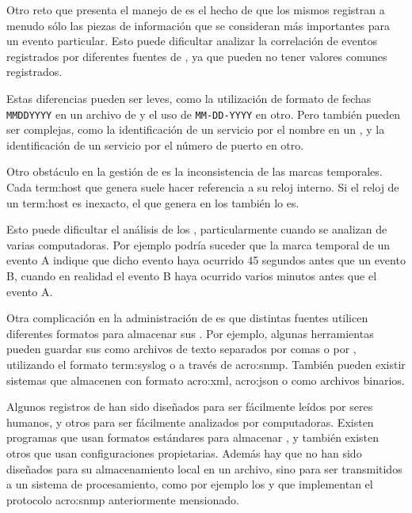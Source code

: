 Otro reto que presenta el manejo de  es el hecho de que los mismos
registran a menudo sólo las piezas de información que se consideran
más importantes para un evento particular. Esto puede dificultar analizar la
correlación de eventos registrados por diferentes fuentes de , ya que
pueden no tener valores comunes registrados.

Estas diferencias pueden ser leves, como la utilización de formato de fechas
\texttt{MMDDYYYY} en un archivo de  y el uso de \texttt{MM-DD-YYYY}
en otro. Pero también pueden ser complejas, como la identificación de un
servicio por el nombre en un , y la identificación de un servicio por
el número de puerto en otro.

Otro obstáculo en la gestión de  es la inconsistencia de las marcas
temporales. Cada \gls{term:host} que genera  suele hacer referencia a
su reloj interno. Si el reloj de un \gls{term:host} es inexacto, el
 que genera en los  también lo es.

Esto puede dificultar el análisis de los , particularmente cuando se
analizan  de varias computadoras. Por ejemplo podría suceder que la
marca temporal de un evento A indique que dicho evento haya ocurrido 45
segundos antes que un evento B, cuando en realidad el evento B haya ocurrido
varios minutos antes que el evento A.

Otra complicación en la administración de  es que distintas fuentes
utilicen diferentes formatos para almacenar sus . Por ejemplo,
algunas herramientas pueden guardar sus  como archivos de texto
separados por comas o por , utilizando el formato \gls{term:syslog} o
a través de \gls{acro:snmp}. También pueden existir sistemas que almacenen
 con formato \gls{acro:xml}, \gls{acro:json} o como archivos
binarios.

Algunos registros de  han sido diseñados para ser fácilmente leídos
por seres humanos, y otros para ser fácilmente analizados por computadoras.
Existen programas que usan formatos estándares para almacenar , y
también existen otros que usan configuraciones propietarias. Además hay
 que no han sido diseñados para su almacenamiento local en un
archivo, sino para ser transmitidos a un sistema de procesamiento, como por
ejemplo los  y  que implementan el protocolo
\gls{acro:snmp}\cite[p.~23]{monitoreo:log_management_guide} anteriormente
mensionado.

